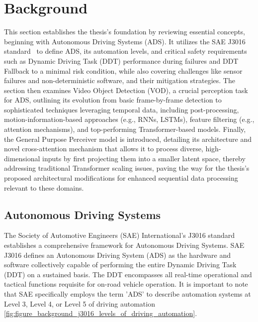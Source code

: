 \section{Background}  \label{Background}

This section establishes the thesis's foundation by reviewing essential concepts, beginning with Autonomous Driving Systems (ADS). It utilizes the SAE J3016 standard~\cite{sae:j3016:2021apr} to define ADS, its automation levels, and critical safety requirements such as Dynamic Driving Task (DDT) performance during failures and DDT Fallback to a minimal risk condition, while also covering challenges like sensor failures and non-deterministic software, and their mitigation strategies. The section then examines Video Object Detection (VOD), a crucial perception task for ADS, outlining its evolution from basic frame-by-frame detection to sophisticated techniques leveraging temporal data, including post-processing, motion-information-based approaches (e.g., RNNs, LSTMs), feature filtering (e.g., attention mechanisms), and top-performing Transformer-based models. Finally, the General Purpose Perceiver model is introduced, detailing its architecture and novel cross-attention mechanism that allows it to process diverse, high-dimensional inputs by first projecting them into a smaller latent space, thereby addressing traditional Transformer scaling issues, paving the way for the thesis's proposed architectural modifications for enhanced sequential data processing relevant to these domains.

\subsection{Autonomous Driving Systems} \label{Background:AutonomousDrivingSystems}


The Society of Automotive Engineers (SAE) International's J3016 standard \cite{sae:j3016:2021apr} establishes a comprehensive framework for Autonomous Driving Systems. SAE J3016 \cite{sae:j3016:2021apr} defines an Autonomous Driving System (ADS) as the hardware and software collectively capable of performing the entire Dynamic Driving Task (DDT) on a sustained basis. The DDT encompasses all real-time operational and tactical functions requisite for on-road vehicle operation. It is important to note that SAE specifically employs the term 'ADS' to describe automation systems at Level 3, Level 4, or Level 5 of driving automation \ref{fig:figure_background_j3016_levels_of_driving_automation}.

